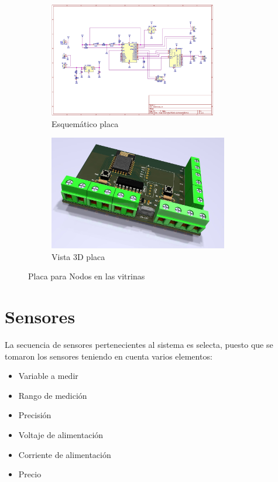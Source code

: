     \begin{figure}[H]
        \centering
        \begin{subfigure}[b]{0.45\linewidth}
        \includegraphics[width=\linewidth, height=5cm]{imagenes/esquematico nodo.jpg}
        \caption{Esquemático placa}
        \label{imag:esquematico_placa}
    \end{subfigure}
    \begin{subfigure}[b]{0.45\linewidth}
        \includegraphics[width=\linewidth, height=5cm]{imagenes/vista 3D.jpg}
        \caption{Vista 3D placa}
        \label{imag:vista3D_placa}
    \end{subfigure}
        \caption{Placa para Nodos en las vitrinas}
        \label{imag:placa_impresa}
    \end{figure}


\section{Sensores} \label{sec:sensores}

    La secuencia de sensores pertenecientes al sistema es selecta, puesto que se tomaron los sensores teniendo en cuenta varios elementos:

    \begin{itemize}
        \item Variable a medir
        \item Rango de medición
        \item Precisión
        \item Voltaje de alimentación
        \item Corriente de alimentación
        \item Precio
    \end{itemize}

